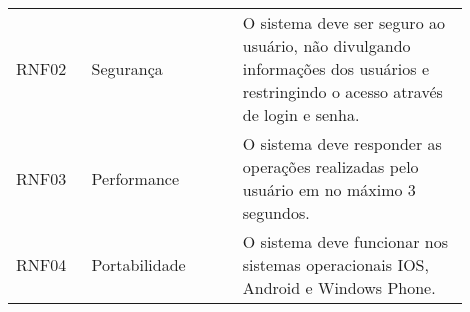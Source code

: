 \begin{table*}[!h]
\begin{tabular}{p{0.15\linewidth}p{0.30\linewidth}p{0.45\linewidth}}
  RNF02 & Segurança & O sistema deve ser seguro ao usuário, não divulgando informações dos usuários e restringindo o acesso através de login e senha.\\

  RNF03 & Performance & O sistema deve responder as operações realizadas pelo usuário em no máximo 3 segundos.\\

  RNF04 & Portabilidade & O sistema deve funcionar nos sistemas operacionais IOS, Android e Windows Phone.\\


  \hline
  \end{tabular}
\end{table*}
\cleardoublepage

